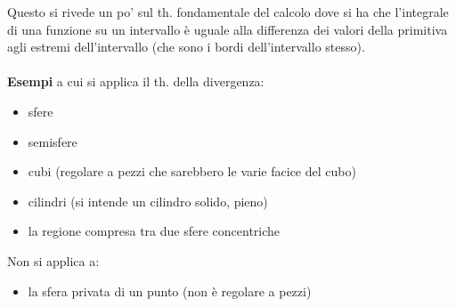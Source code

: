 \documentclass[a4paper, oneside]{article}
\begin{document}
Questo si rivede un po' sul th. fondamentale del calcolo dove si ha che l'integrale di una funzione su un intervallo è uguale alla differenza dei valori della primitiva agli estremi dell'intervallo (che sono i bordi dell'intervallo stesso).\\
\hfil\\
\textbf{Esempi} a cui si applica il th. della divergenza:
\begin{itemize}
  \item sfere
  \item semisfere
  \item cubi (regolare a pezzi che sarebbero le varie facice del cubo)
  \item cilindri (si intende un cilindro solido, pieno)
  \item la regione compresa tra due sfere concentriche
\end{itemize}
Non si applica a:
\begin{itemize}
  \item la sfera privata di un punto (non è regolare a pezzi)
\end{itemize}
\hfill\\
\end{document}
